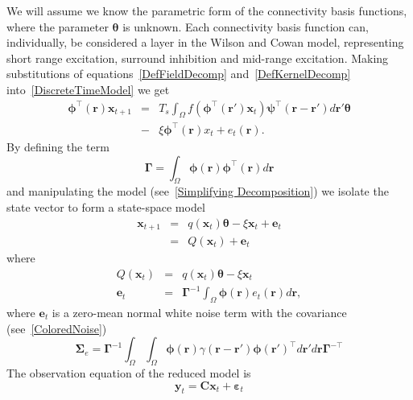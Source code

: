 \documentclass[12pt]{iopart}
\begin{document}
We will assume we know the parametric form of the connectivity basis functions, where the parameter $\boldsymbol{\theta}$ is unknown. Each connectivity basis function can, individually, be considered a layer in the Wilson and Cowan model, representing short range excitation, surround inhibition and mid-range excitation. Making substitutions of equations~\ref{DefFieldDecomp} and~\ref{DefKernelDecomp} into~\ref{DiscreteTimeModel} we get 
\begin{eqnarray}
	\label{reduced continuous model}\boldsymbol{\phi}^{\top}(\mathbf{r})\mathbf{x}_{t+1}&=& T_s\int_\Omega{f(\boldsymbol{\phi}^{\top}(\mathbf{r}')\mathbf{x}_t )\boldsymbol{\psi}^{\top}(\mathbf{r}-\mathbf{r}')d\mathbf{r}'}\boldsymbol{\theta}\nonumber \\ 
	&-& \xi\boldsymbol{\phi}^{\top}(\mathbf{r})x_t + e_t(\mathbf{r}). 
\end{eqnarray}
By defining the term 
\begin{equation}
	\label{DefGamma} \boldsymbol{\Gamma} = \int_\Omega {\boldsymbol{\phi} \left(\mathbf{r}\right)\boldsymbol{\phi} ^{\top}\left(\mathbf{r}\right)d\mathbf{r}} 
\end{equation}
and manipulating the model (see~\ref{Simplifying Decomposition}) we isolate the state vector to form a state-space model 
\begin{eqnarray}
	\label{Homogeneous SS Model} \mathbf{x}_{t+1} &=& q(\mathbf{x}_t)\boldsymbol{\theta} - \xi\mathbf{x}_t + \mathbf{e}_t \\
	&=& Q\left(\mathbf{x}_t\right) + \mathbf{e}_t 
\end{eqnarray}
where
\begin{eqnarray}
Q\left( \mathbf{x}_t \right) &=& q(\mathbf{x}_t)\boldsymbol{\theta} - \xi\mathbf{x}_t \label{eq:QmatrixForSigmapoints}\\
	\mathbf{e}_t &=& \label{eq:Reducednoiseterm} \boldsymbol{\Gamma}^{-1}\int_\Omega{\boldsymbol{\phi}(\mathbf{r})e_t(\mathbf{r})d\mathbf{r}}, 
\end{eqnarray}
where $\mathbf{e}_t$ is a zero-mean normal white noise term with the covariance (see~\ref{ColoredNoise}) 
\begin{equation}
	\boldsymbol{\Sigma}_e=\boldsymbol{\Gamma}^{-1}\int_{\Omega}\int_{\Omega}\boldsymbol{\phi}\left(\mathbf r\right) \gamma\left(\mathbf{r}- \mathbf{r}' \right)\boldsymbol{\phi}\left(\mathbf{r}'\right)^{\top}d\mathbf{r}' d\mathbf{r}\boldsymbol{\Gamma}^{- \top} 
\end{equation}
The observation equation of the reduced model is 
\begin{equation}
	\label{ObservationEquation} \mathbf{y}_t = \mathbf{C}\mathbf{x}_t + \boldsymbol{\varepsilon}_t 
\end{equation}
\end{document}
